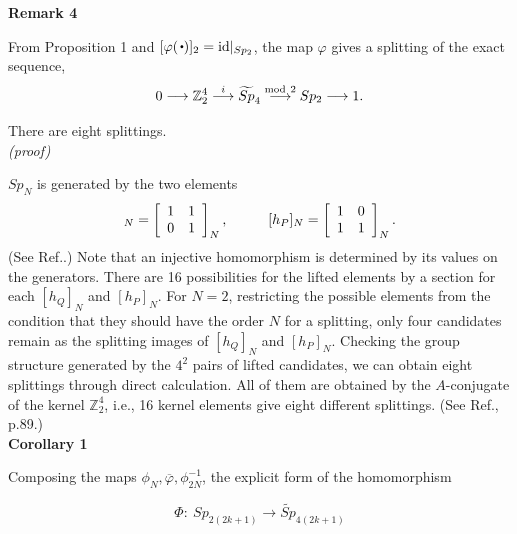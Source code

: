 \documentclass[12pt]{iopart}
\newcommand{\sbt}{\,\begin{picture}(-1,1)(-1,-3)\circle*{2}\end{picture}\ }
\newcommand{\xrightarrowmd}{\stackrel{\rm mod\ 2}{\longrightarrow}}
\newcommand{\xrightarrowi}{\stackrel{{\ i\ }}{\longrightarrow}}
\begin{document}
\noindent
{\bf Remark 4}
\vspace{2mm}

From Proposition 1 and \([\varphi(\sbt)]_2={\rm id}|_{Sp_2}\), the map \(\varphi\) gives a splitting of the exact sequence,
\begin{equation}
0\longrightarrow\mathbb Z_2^4\xrightarrowi\widetilde{Sp}_4\xrightarrowmd Sp_2\longrightarrow1.
\end{equation}

There are eight splittings.
\\

\noindent
{\it (proof)}

\(Sp_N\) is generated by the two elements
\begin{equation}
[h_Q]_N=
\left[\begin{array}{cc}
1 & 1 \\\relax{}
0 & 1 \\
\end{array}\right]_N,
\hspace{10mm}
[h_P]_N=
\left[\begin{array}{cc}
1 & 0 \\\relax{}
1 & 1 \\
\end{array}\right]_N.
\end{equation}
(See Ref.\cite{Watanabe-Hashimoto-Horibe-Hayashi_2019}.)
%
Note that an injective homomorphism is determined by its values on the generators.
There are 16 possibilities for the lifted elements by a section for each \([h_Q]_N\) and \([h_P]_N\).
For \(N=2\), restricting the possible elements from the condition that they should have the order \(N\) for a splitting,
only four candidates remain as the splitting images of \([h_Q]_N\) and \([h_P]_N\).
Checking the group structure generated by the \(4^2\) pairs of lifted candidates,
we can obtain eight splittings through direct calculation.
All of them are obtained by the \(A\)-conjugate of the kernel \(\mathbb Z_2^4\),
i.e., 16 kernel elements give eight different splittings.
(See Ref.\cite{Brown}, p.89.)
\\

\noindent
{\bf Corollary 1}
\vspace{2mm}

Composing the maps \(\phi_N, \overline\varphi, \phi_{2N}^{-1}\),
the explicit form of the homomorphism

\begin{equation}
\Phi:\ Sp_{2(2k+1)}\longrightarrow\widetilde{Sp}_{4(2k+1)}
\end{equation}
\end{document}
